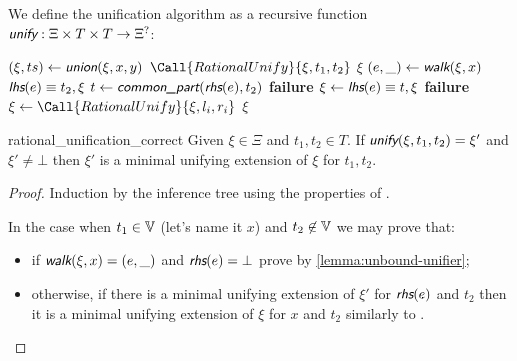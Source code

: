 We define the unification algorithm as a recursive function $\unify : \Xi \times T \times T \rightarrow \Xi^?$:
\begin{algorithmic}[1]
            \State $(\xi, ts) \gets \union(\xi, x, y)$
                \State \Return $\Call{RationalUnify}{\xi, t_1, t_2}$
            \Else
                \State \Return $\xi$
            \EndIf
            \State $(e, \_) \gets \walk(\xi, x)$
                \State \Return $\lhs(e) \equiv t_2, \xi$
            \Else
                \State $t \gets \commonpart(\rhs(e), t_2)$
                    \State \bf failure
                \Else
                    \State $\xi \gets \lhs(e) \equiv t, \xi$
                    \State \Return {}
                \EndIf
            \EndIf
            \State \Return {}
                \State \bf failure
            \Else
                    \State $\xi \gets \Call{RationalUnify}{\xi, l_i, r_i}$
                \EndFor
                \State \Return $\xi$
            \EndIf
        \EndIf
    \EndFunction
\end{algorithmic}

\begin{rocqtheorem}{rational_unification_correct}
    Given $\xi \in \Xi$ and $t_1, t_2 \in T$. If $\unify(\xi, t_1, t_2) = \xi'$ and $\xi' \neq \bot$ then $\xi'$ is a minimal unifying extension of $\xi$ for $t_1, t_2$.
\end{rocqtheorem}
\begin{proof}
    Induction by the inference tree using the properties of \union.

    In the case when $t_1 \in \mathbb{V}$ (let's name it $x$) and $t_2 \not\in \mathbb{V}$ we may prove that:
    \begin{itemize}
        \item if $\walk(\xi, x) = (e, \_)$ and $\rhs(e) = \bot$ prove by \autoref{lemma:unbound-unifier};
        \item otherwise, if there is a minimal unifying extension of $\xi'$ for $\rhs(e)$ and $t_2$ then it is a minimal unifying extension of $\xi$ for $x$ and $t_2$ similarly to \union.
    \end{itemize}
\end{proof}

